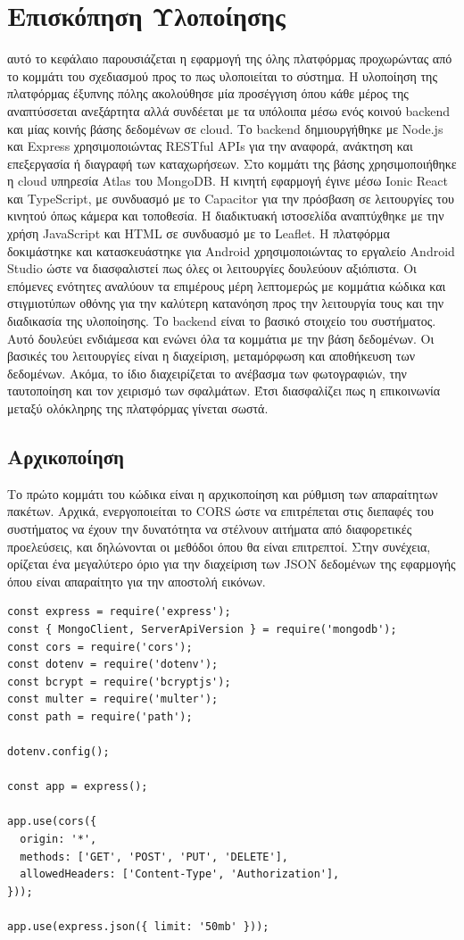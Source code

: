 \section{Επισκόπηση Υλοποίησης}
 αυτό το κεφάλαιο παρουσιάζεται η εφαρμογή της όλης πλατφόρμας προχωρώντας από το κομμάτι του σχεδιασμού προς το πως υλοποιείται το σύστημα. Η υλοποίηση της πλατφόρμας έξυπνης πόλης ακολούθησε μία προσέγγιση όπου κάθε μέρος της αναπτύσσεται ανεξάρτητα αλλά συνδέεται με τα υπόλοιπα μέσω ενός κοινού backend και μίας κοινής βάσης δεδομένων σε cloud. Το backend δημιουργήθηκε με Node.js και Express χρησιμοποιώντας RESTful APIs για την αναφορά, ανάκτηση και επεξεργασία ή διαγραφή των καταχωρήσεων. Στο κομμάτι της βάσης χρησιμοποιήθηκε η cloud υπηρεσία Atlas του MongoDB. Η κινητή εφαρμογή έγινε μέσω Ionic React και TypeScript, με συνδυασμό με το Capacitor για την πρόσβαση σε λειτουργίες του κινητού όπως κάμερα και τοποθεσία. Η διαδικτυακή ιστοσελίδα αναπτύχθηκε με την χρήση JavaScript και HTML σε συνδυασμό με το Leaflet. Η πλατφόρμα δοκιμάστηκε και κατασκευάστηκε για Android χρησιμοποιώντας το εργαλείο Android Studio ώστε να διασφαλιστεί πως όλες οι λειτουργίες δουλεύουν αξιόπιστα. Οι επόμενες ενότητες αναλύουν τα επιμέρους μέρη λεπτομερώς με κομμάτια κώδικα και στιγμιοτύπων οθόνης για την καλύτερη κατανόηση προς την λειτουργία τους και την διαδικασία της υλοποίησης.
\newpage
Το backend είναι το βασικό στοιχείο του συστήματος. Αυτό δουλεύει ενδιάμεσα και ενώνει όλα τα κομμάτια με την βάση δεδομένων. Οι βασικές του λειτουργίες είναι η διαχείριση, μεταμόρφωση και αποθήκευση των δεδομένων. Ακόμα, το ίδιο διαχειρίζεται το ανέβασμα των φωτογραφιών, την ταυτοποίηση και τον χειρισμό των σφαλμάτων. Έτσι διασφαλίζει πως η επικοινωνία μεταξύ ολόκληρης της πλατφόρμας γίνεται σωστά.

\subsection{Αρχικοποίηση}
Το πρώτο κομμάτι του κώδικα είναι η αρχικοποίηση και ρύθμιση των απαραίτητων πακέτων. Αρχικά, ενεργοποιείται το CORS ώστε να επιτρέπεται στις διεπαφές του συστήματος να έχουν την δυνατότητα να στέλνουν αιτήματα από διαφορετικές προελεύσεις, και δηλώνονται οι μεθόδοι όπου θα είναι επιτρεπτοί. Στην συνέχεια, ορίζεται ένα μεγαλύτερο όριο για την διαχείριση των JSON δεδομένων της εφαρμογής όπου είναι απαραίτητο για την αποστολή εικόνων.
\\

\begin{lstlisting}
const express = require('express');
const { MongoClient, ServerApiVersion } = require('mongodb');
const cors = require('cors');
const dotenv = require('dotenv');
const bcrypt = require('bcryptjs');
const multer = require('multer');
const path = require('path');

dotenv.config();

const app = express();

app.use(cors({
  origin: '*',
  methods: ['GET', 'POST', 'PUT', 'DELETE'],
  allowedHeaders: ['Content-Type', 'Authorization'],
}));

app.use(express.json({ limit: '50mb' }));
\end{lstlisting}

